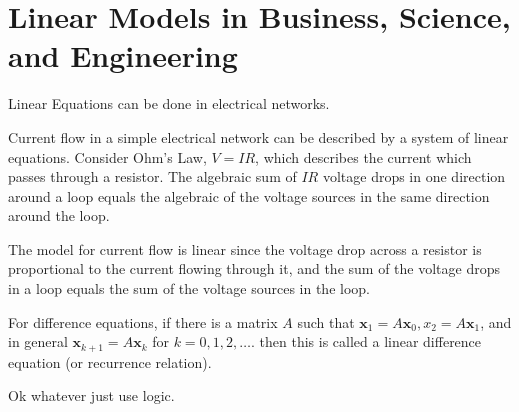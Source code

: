 \documentclass[../linalg.tex]{subfiles}
\begin{document}
\section{Linear Models in Business, Science, and Engineering}
Linear Equations can be done in electrical networks.

Current flow in a simple electrical network can be described by a system of linear equations. Consider Ohm's Law, $V=IR$, which describes the current which passes through a resistor.
The algebraic sum of $IR$ voltage drops in one direction around a loop equals the algebraic of the voltage sources in the same direction around the loop.

The model for current flow is linear since the voltage drop across a resistor is proportional to the current flowing through it, and the sum of the voltage drops in a loop equals the sum of the voltage sources in the loop.

For difference equations, if there is a matrix $A$ such that $\textbf{x}_1=A\textbf{x}_0,x_2=A\textbf{x}_1$, and in general $\textbf{x}_{k+1}=A\textbf{x}_k$ for $k=0,1,2,\dots$. then this is called a linear difference equation (or recurrence relation).

Ok whatever just use logic.
\end{document}
